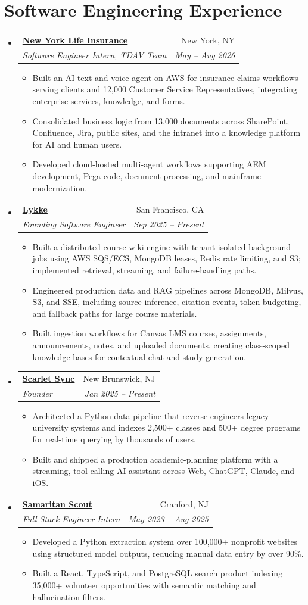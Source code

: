 \documentclass[letterpaper,11pt]{article}
\makeatletter
\newcommand{\resumeItem}[1]{
  \item\small{
    {#1 \vspace{-2pt}}
  }
}
\newcommand{\resumeSubheading}[4]{
  \vspace{-2pt}\item
    \begin{tabular*}{0.97\textwidth}[t]{l@{\extracolsep{\fill}}r}
      \textbf{#1} & #2 \\
      \textit{\small#3} & \textit{\small #4} \\
    \end{tabular*}\vspace{-7pt}
}
\newcommand{\resumeSubHeadingListStart}{\begin{itemize}[leftmargin=0.15in, label={}]}
\newcommand{\resumeSubHeadingListEnd}{\end{itemize}}
\newcommand{\resumeItemListStart}{\begin{itemize}}
\newcommand{\resumeItemListEnd}{\end{itemize}\vspace{-5pt}}
\makeatother
\begin{document}
\section{Software Engineering Experience}
  \resumeSubHeadingListStart
    \resumeSubheading
      {\href{https://newyorklife.com/}{New York Life Insurance}}{New York, NY}
      {Software Engineer Intern, TDAV Team}{May -- Aug 2026}
      \resumeItemListStart
        \resumeItem{Built an AI text and voice agent on AWS for insurance claims workflows serving clients and 12,000 Customer Service Representatives, integrating enterprise services, knowledge, and forms.}
        \resumeItem{Consolidated business logic from 13,000 documents across SharePoint, Confluence, Jira, public sites, and the intranet into a knowledge platform for AI and human users.}
        \resumeItem{Developed cloud-hosted multi-agent workflows supporting AEM development, Pega code, document processing, and mainframe modernization.}
      \resumeItemListEnd
    \newpage
    \resumeSubheading
      {\href{https://getlykke.com/}{Lykke}}{San Francisco, CA}
      {Founding Software Engineer}{Sep 2025 -- Present}
      \resumeItemListStart
        \resumeItem{Built a distributed course-wiki engine with tenant-isolated background jobs using AWS SQS/ECS, MongoDB leases, Redis rate limiting, and S3; implemented retrieval, streaming, and failure-handling paths.}
        \resumeItem{Engineered production data and RAG pipelines across MongoDB, Milvus, S3, and SSE, including source inference, citation events, token budgeting, and fallback paths for large course materials.}
        \resumeItem{Built ingestion workflows for Canvas LMS courses, assignments, announcements, notes, and uploaded documents, creating class-scoped knowledge bases for contextual chat and study generation.}
      \resumeItemListEnd
    \resumeSubheading
      {\href{https://scarletsync.app/}{Scarlet Sync}}{New Brunswick, NJ}
      {Founder}{Jan 2025 -- Present}
      \resumeItemListStart
        \resumeItem{Architected a Python data pipeline that reverse-engineers legacy university systems and indexes 2,500+ classes and 500+ degree programs for real-time querying by thousands of users.}
        \resumeItem{Built and shipped a production academic-planning platform with a streaming, tool-calling AI assistant across Web, ChatGPT, Claude, and iOS.}
      \resumeItemListEnd
    \resumeSubheading
      {\href{https://www.samaritanscout.org/}{Samaritan Scout}}{Cranford, NJ}
      {Full Stack Engineer Intern}{May 2023 -- Aug 2025}
      \resumeItemListStart
        \resumeItem{Developed a Python extraction system over 100,000+ nonprofit websites using structured model outputs, reducing manual data entry by over 90\%.}
        \resumeItem{Built a React, TypeScript, and PostgreSQL search product indexing 35,000+ volunteer opportunities with semantic matching and hallucination filters.}
      \resumeItemListEnd
  \resumeSubHeadingListEnd
\end{document}
